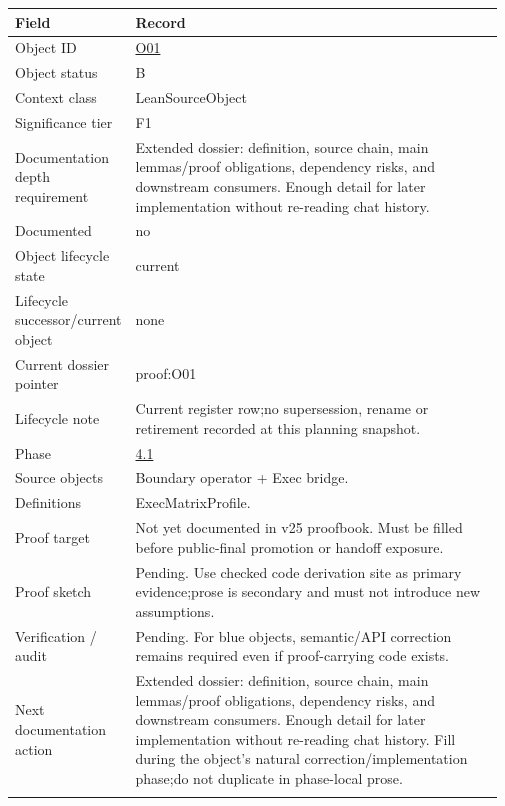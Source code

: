 \begin{longtable}{L{0.16\linewidth} L{0.81\linewidth}}
\hline
\textbf{Field} & \textbf{Record}\\
\hline
Object ID & \hyperlink{object-row-O01}{O01}\\
\hline\addlinespace[0.20em]
Object status & B\\
\hline\addlinespace[0.20em]
Context class & LeanSourceObject\\
\hline\addlinespace[0.20em]
Significance tier & F1\\
\hline\addlinespace[0.20em]
Documentation depth requirement & Extended dossier: definition, source chain, main lemmas/\allowbreak{}proof obligations, dependency risks, and downstream consumers. Enough detail for later implementation without re-reading chat history.\\
\hline\addlinespace[0.20em]
Documented & no\\
\hline\addlinespace[0.20em]
Object lifecycle state & current\\
\hline\addlinespace[0.20em]
Lifecycle successor/\allowbreak{}current object & none\\
\hline\addlinespace[0.20em]
Current dossier pointer & proof:O01\\
\hline\addlinespace[0.20em]
Lifecycle note & Current register row;\newline no supersession, rename or retirement recorded at this planning snapshot.\\
\hline\addlinespace[0.20em]
Phase & \hyperlink{phase-row-4-1}{4.1}\\
\hline\addlinespace[0.20em]
Source objects & Boundary operator + Exec bridge.\\
\hline\addlinespace[0.20em]
Definitions & ExecMatrixProfile.\\
\hline\addlinespace[0.20em]
Proof target & Not yet documented in v25 proofbook. Must be filled before public-final promotion or handoff exposure.\\
\hline\addlinespace[0.20em]
Proof sketch & Pending. Use checked code derivation site as primary evidence;\newline prose is secondary and must not introduce new assumptions.\\
\hline\addlinespace[0.20em]
Verification /\allowbreak{} audit & Pending. For blue objects, semantic/\allowbreak{}API correction remains required even if proof-carrying code exists.\\
\hline\addlinespace[0.20em]
Next documentation action & Extended dossier: definition, source chain, main lemmas/\allowbreak{}proof obligations, dependency risks, and downstream consumers. Enough detail for later implementation without re-reading chat history. Fill during the object's natural correction/\allowbreak{}implementation phase;\newline do not duplicate in phase-local prose.\\
\hline\addlinespace[0.20em]
\end{longtable}
